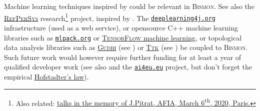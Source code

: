 Machine learning techniques inspired by \cite{zhang:2019:learned}
could be relevant in \textsc{Bismon}. See also the
\href{http://refpersys.org/}{\textsc{RefPerSys}}  research\footnote{Also related:
  \href{https://afia.asso.fr/journee-hommage-j-pitrat/}{talks in the
    memory of J.Pitrat, AFIA, March 6\textsuperscript{th}, 2020,
    Paris.}} project, inspired by \cite{Pitrat:1996:FGCS,
  Pitrat:2009:AST, Pitrat:2009:ArtifBeings, Starynkevitch-1990-EUM,
  Bordini:2020:agent}. The   
\href{https://deeplearning4j.org/}{\texttt{deeplearning4j.org}}
infrastructure (used as a web service), or opensource C++ machine
learning libraries such as   \href{https://mlpack.org}{\texttt{mlpack.org}}
or \href{https://www.tensorflow.org/}{\textsc{TensorFlow} machine
  learning}, or  topological data analysis libraries such as
\href{https://gudhi.inria.fr/}{\textsc{Gudhi}} (see
\cite{gudhi:2020:urm, gudhi:2020:PersistentCohomology,
  gudhi:2020:RipsComplex}) or
\href{https://topology-tool-kit.github.io/}{\textsc{Ttk}} (see
\cite{Masood:2019:ttk}) be coupled to \textsc{Bismon}. Such future
work would however require further funding for at least a year of
qualified developer work (see also
\cite{Maglogiannis:2007:emerging-ai-app} and
 the
\href{https://www.ai4eu.eu/}{\texttt{ai4eu.eu}} project, but don't
forget the empirical
\href{https://en.wikipedia.org/wiki/Hofstadter\%27s\_law}{Hofstadter's
  law}).

\medskip

